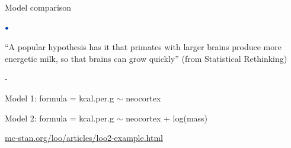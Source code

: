 \documentclass[english,t]{beamer}
\newenvironment{list1}{
   \begin{list}{$\color{list1}\bullet$}{\itemsep=6pt}}{
  \end{list}}
\newenvironment{list2}{
  \begin{list}{-}{\baselineskip=12pt\itemsep=2pt}}{
  \end{list}}
\begin{document}
\begin{frame}{}

{\Large\color{navyblue} Model comparison}

\begin{list1}
\item ``A popular hypothesis has it that primates with larger brains
  produce more energetic milk, so that brains can grow quickly'' (from
  Statistical Rethinking)
  \begin{list2}
    \item Model 1: formula = kcal.per.g $\sim$ neocortex
    \item Model 2: formula = kcal.per.g $\sim$ neocortex + log(mass)
  \end{list2}
\end{list1}

\vspace{10\baselineskip}
{\small \url{mc-stan.org/loo/articles/loo2-example.html}}

\end{frame}

\begin{frame}

  \\

\end{frame}
\end{document}
